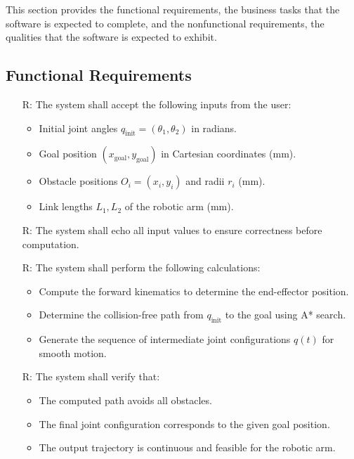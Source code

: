 \documentclass[12pt]{article}
\newcounter{reqnum} %
\begin{document}
This section provides the functional requirements, the business tasks that the
software is expected to complete, and the nonfunctional requirements, the
qualities that the software is expected to exhibit.

\subsection{Functional Requirements}

\noindent \begin{itemize}

  \item[R\refstepcounter{reqnum}\thereqnum \label{R_Inputs}:]  
    The system shall accept the following inputs from the user:
    \begin{itemize}
      \item Initial joint angles \( q_{\text{init}} = (\theta_1, \theta_2) \) in radians.
      \item Goal position \( (x_{\text{goal}}, y_{\text{goal}}) \) in Cartesian coordinates (\si{\milli\metre}).
      \item Obstacle positions \( O_i = (x_i, y_i) \) and radii \( r_i \) (\si{\milli\metre}).
      \item Link lengths \( L_1, L_2 \) of the robotic arm (\si{\milli\metre}).
    \end{itemize}
  
  \item[R\refstepcounter{reqnum}\thereqnum \label{R_OutputInputs}:]  
    The system shall echo all input values to ensure correctness before computation.
  
  \item[R\refstepcounter{reqnum}\thereqnum \label{R_Calculate}:]  
    The system shall perform the following calculations:
    \begin{itemize}
      \item Compute the forward kinematics to determine the end-effector position.
      \item Determine the collision-free path from \( q_{\text{init}} \) to the goal using A* search.
      \item Generate the sequence of intermediate joint configurations \( q(t) \) for smooth motion.
    \end{itemize}
  
  \item[R\refstepcounter{reqnum}\thereqnum \label{R_VerifyOutput}:]  
    The system shall verify that:
    \begin{itemize}
      \item The computed path avoids all obstacles.
      \item The final joint configuration corresponds to the given goal position.
      \item The output trajectory is continuous and feasible for the robotic arm.
    \end{itemize}
  

\end{itemize}
\end{document}
